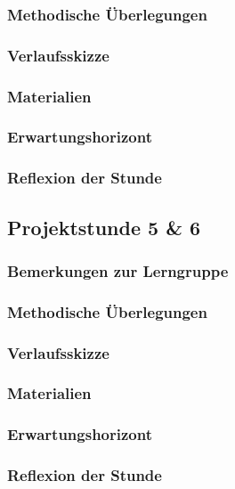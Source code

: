 \subsubsection{Methodische Überlegungen}
\subsubsection{Verlaufsskizze}
\subsubsection{Materialien}
\subsubsection{Erwartungshorizont}
\subsubsection{Reflexion der Stunde}
\newpage
\subsection{Projektstunde 5 \& 6}\steffen
\subsubsection{Bemerkungen zur Lerngruppe}
\subsubsection{Methodische Überlegungen}
\subsubsection{Verlaufsskizze}
\subsubsection{Materialien}
\subsubsection{Erwartungshorizont}
\subsubsection{Reflexion der Stunde}